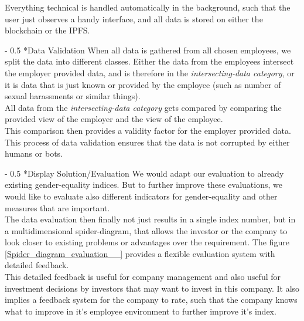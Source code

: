 \documentclass[portrait,a4paper]{article}
\makeatletter
\renewcommand\paragraph{\@startsection{paragraph}{4}{0mm}%
	{-\baselineskip}%
	{0.5\baselineskip}%
	{\normalfont\bfseries}%
}%
\makeatother
\begin{document}
			Everything technical is handled automatically in the background, such that the 
			user just observes a handy interface, and all data is stored on either the blockchain or the IPFS.

		\paragraph*{Data Validation}
			When all data is gathered from all chosen employees, we split the data into different classes. 
			Either the data from the employees intersect the employer provided data, and is therefore 
			in the \textit{intersecting-data category}, or it is data that is just known or 
			provided by the employee (such as number of sexual harassments or similar things).\\

			All data from the \textit{intersecting-data category} gets compared by comparing the 
			provided view of the employer and the view of the employee.\\
			This comparison then provides a validity factor for the employer provided data.\\

			This process of data validation ensures that the data is not corrupted by either humans or bots.

		\paragraph*{Display Solution/Evaluation}
			We would adapt our evaluation to already existing gender-equality indices. 
			But to further improve these evaluations, we would like to evaluate also different indicators 
			for gender-equality and other measures that are important.\\
			The data evaluation then finally not just results in a single index number, but in a multidimensional 
			spider-diagram, that allows the investor or the company to look closer to existing problems or 
			advantages over the requirement.
			The figure \ref{Spider_diagram_evaluation__} provides a flexible evaluation system with detailed feedback.\\
			This detailed feedback is useful for company management and also useful for investment decisions 
			by investors that may want to invest in this company. It also implies a feedback system for the 
			company to rate, such that the company knows what to improve in it's employee environment to 
			further improve it's index.	
	
\end{document}
